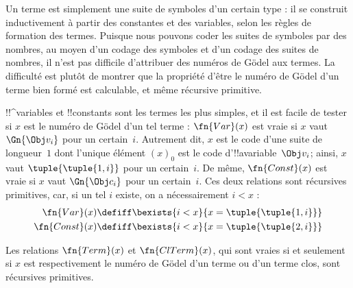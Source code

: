 \documentclass[../../../include/open-logic-section]{subfiles}
\begin{document}

\begin{explain}
Un terme est simplement une suite de symboles d'un certain type :
il se construit inductivement à partir des constantes et des
variables, selon les règles de formation des termes. Puisque nous
pouvons coder les suites de symboles par des nombres, au moyen d'un
codage des symboles et d'un codage des suites de nombres, il n'est
pas difficile d'attribuer des numéros de G\"odel aux termes. La
difficulté est plutôt de montrer que la propriété d'être le numéro
de G\"odel d'un terme bien formé est calculable, et même récursive
primitive.
\end{explain}

!!^{variable}s et !!{constant}s sont les termes les plus simples,
et il est facile de tester si $x$ est le numéro de G\"odel d'un tel
terme : $\fn{Var}(x)$ est vraie si $x$ vaut $\Gn{\Obj v_i}$ pour un
certain~$i$. Autrement dit, $x$ est le code d'une suite de longueur~$1$
dont l'unique élément $(x)_0$ est le code d'!!a{variable}~$\Obj v_i$;
ainsi, $x$ vaut $\tuple{\tuple{1, i}}$ pour un certain~$i$. De même,
$\fn{Const}(x)$ est vraie si $x$ vaut $\Gn{\Obj c_i}$ pour un
certain~$i$. Ces deux relations sont récursives primitives, car, si
un tel $i$ existe, on a nécessairement $i<x$ :
\begin{align*}
  \fn{Var}(x) & \defiff \bexists{i<x}{x = \tuple{\tuple{1, i}}}\\
  \fn{Const}(x) & \defiff \bexists{i<x}{x = \tuple{\tuple{2, i}}}
\end{align*}

\begin{prop}
Les relations $\fn{Term}(x)$ et $\fn{ClTerm}(x)$, qui sont vraies si
et seulement si $x$ est respectivement le numéro de G\"odel d'un
terme ou d'un terme clos, sont récursives primitives.
\end{prop}
\end{document}
